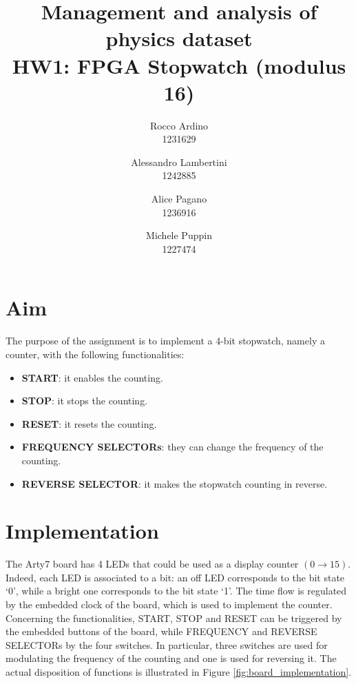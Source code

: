 \documentclass[11pt, a4paper]{article}
\begin{document}
\author{Rocco Ardino\\1231629  \and Alessandro Lambertini\\ 1242885 \and Alice Pagano \\1236916 \and Michele Puppin \\ 1227474}
\title{\textbf{Management and analysis of physics dataset \\ HW1: FPGA  Stopwatch (modulus 16)}}
\maketitle

\section{Aim}
The purpose of the assignment is to implement a 4-bit stopwatch, namely a counter, with the following functionalities:
\begin{itemize}
\item \textbf{START}: it enables the counting.
\item \textbf{STOP}: it stops the counting.
\item \textbf{RESET}: it resets the counting.
\item \textbf{FREQUENCY SELECTORs}: they can change the frequency of the counting.
\item \textbf{REVERSE SELECTOR}: it makes the stopwatch counting in reverse.
\end{itemize}





\section{Implementation}
The Arty7 board has 4 LEDs that could be used as a display counter \( (0 \rightarrow 15) \). Indeed, each LED is associated to a bit: an off LED corresponds to the bit state `0', while a bright one corresponds to the bit state `1'. The time flow is regulated by the embedded clock of the board, which is used to implement the counter.
Concerning the functionalities, START, STOP and RESET can be triggered by the embedded buttons of the board,  while FREQUENCY and REVERSE SELECTORs by the four switches. In particular, three switches are used for modulating the frequency of the counting and one is used for reversing it. The actual disposition of functions is illustrated in Figure \ref{fig:board_implementation}.
\end{document}
